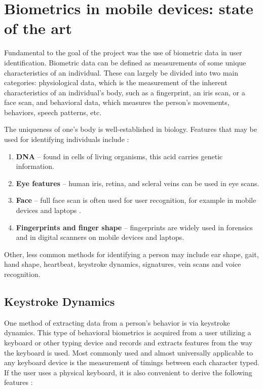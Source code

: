 
\chapter{Biometrics in mobile devices: state of the art} \label{biometrics_theory}

Fundamental to the goal of the project was the use of biometric data in user identification. Biometric data can be defined as measurements of some unique characteristics of an individual. These can largely be divided into two main categories: physiological data, which is the measurement of the inherent characteristics of an individual's body, such as a fingerprint, an iris scan, or a face scan, and behavioral data, which measures the person's movements, behaviors, speech patterns, etc. \cite{Abde2023}

The uniqueness of one's body is well-established in biology. Features that may be used for identifying individuals include \cite{biometrics_institute_2025}:

\begin{enumerate}
    \item \textbf{DNA} -- found in cells of living organisms, this acid carries genetic information.
    \item \textbf{Eye features} -- human iris, retina, and scleral veins can be used in eye scans.
    \item \textbf{Face} -- full face scan is often used for user recognition, for example in mobile devices and laptops \cite{google_mlkit_face_detection_2025}.
    \item \textbf{Fingerprints and finger shape} -- fingerprints are widely used in forensics \cite{nist_forensic_biometrics_2025} and in digital scanners on mobile devices and laptops.
\end{enumerate}

Other, less common methods for identifying a person may include ear shape, gait, hand shape, heartbeat, keystroke dynamics, signatures, vein scans and voice recognition.

\section{Keystroke Dynamics}
One method of extracting data from a person's behavior is via keystroke dynamics. This type of behavioral biometrics is acquired from a user utilizing a keyboard or other typing device and records and extracts features from the way the keyboard is used. Most commonly used and almost universally applicable to any keyboard device is the measurement of timings between each character typed. If the user uses a physical keyboard, it is also convenient to derive the following features \cite{Shar2023}:

